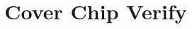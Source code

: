 \documentclass[type=zwischenbericht]{zukunftbau}
\title{Cover Chip Verify}
\begin{document}
\makecoverpages
\end{document}
